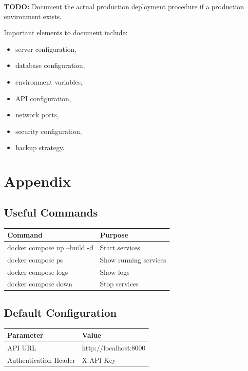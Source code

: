 \documentclass[12pt,a4paper]{article}
\begin{document}
\textbf{TODO:} Document the actual production deployment procedure
if a production environment exists.

Important elements to document include:

\begin{itemize}
    \item server configuration,
    \item database configuration,
    \item environment variables,
    \item API configuration,
    \item network ports,
    \item security configuration,
    \item backup strategy.
\end{itemize}


\section{Appendix}

\subsection{Useful Commands}

\begin{longtable}{ll}
\toprule
\textbf{Command} & \textbf{Purpose}\\
\midrule
docker compose up --build -d & Start services\\
docker compose ps & Show running services\\
docker compose logs & Show logs\\
docker compose down & Stop services\\
\bottomrule
\end{longtable}

\subsection{Default Configuration}

\begin{longtable}{ll}
\toprule
\textbf{Parameter} & \textbf{Value}\\
\midrule
API URL & http://localhost:8000\\
Authentication Header & X-API-Key\\
\bottomrule
\end{longtable}
\end{document}
